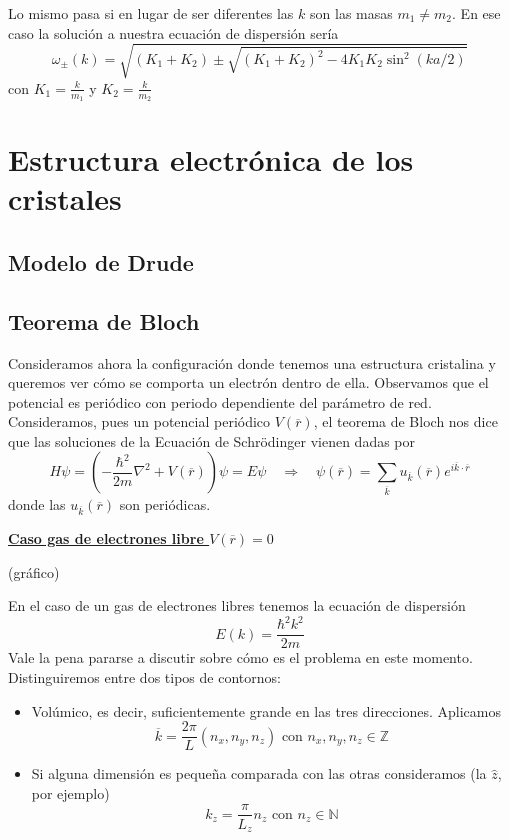 \documentclass[leqno]{article}
\begin{document}
Lo mismo pasa si en lugar de ser diferentes las $k$ son las masas  $m_1\neq m_2$. En ese caso la solución a nuestra ecuación de dispersión sería
\[
  \boxed{\omega _{\pm}(k) = \sqrt{ (K_1+K_2)\pm \sqrt{(K_1+K_2)^2-4K_1K_2\sin^2(ka / 2)} } }
\] 
con $K_1= \frac{k}{m_1}$ y $K_2 = \frac{k}{m_2}$



\section{Estructura electrónica de los cristales}
\subsection{Modelo de Drude}

\subsection{Teorema de Bloch}
Consideramos ahora la configuración donde tenemos una estructura cristalina y queremos ver cómo se comporta un electrón dentro de ella. Observamos que el potencial es periódico con periodo dependiente del parámetro de red. Consideramos, pues un potencial periódico $V(\overline{r})$, el teorema de Bloch nos dice que las soluciones de la Ecuación de Schrödinger vienen dadas por 
\[
H\psi = \left( -\frac{\hbar ^2}{2m}\nabla ^2 + V(\overline{r}) \right) \psi = E\psi \quad \Rightarrow \quad \psi (\overline{r}) = \sum _{\overline{k}} u_{\overline{k}}(\overline{r}) e ^{i \overline{k}\cdot \overline{r}}
\] 
donde las $u_{\overline{k}}(\overline{r})$ son periódicas.

\underline{\textbf{Caso gas de electrones libre $V(\overline{r})=0$}}

(gráfico)

En el caso de un gas de electrones libres tenemos la ecuación de dispersión
\[
E(k) = \frac{\hbar ^2 k^2}{2m}
\] 
Vale la pena pararse a discutir sobre cómo es el problema en este momento. Distinguiremos entre dos tipos de contornos:
\begin{itemize}[topsep=-6pt, itemsep=0pt]
  \item Volúmico, es decir, suficientemente grande en las tres direcciones. Aplicamos
	\[
	\overline{k} = \frac{2\pi }{L} (n_x, n_y, n_z) \text{ con } n_x, n_y, n_z \in \mathbb{Z}
	\] 
  \item Si alguna dimensión es pequeña comparada con las otras consideramos (la $\hat{z}$, por ejemplo)
	\[
	k_z = \frac{\pi}{L_z} n_z \text{ con } n_z \in \mathbb{N}
	\] 
\end{itemize}
\end{document}
